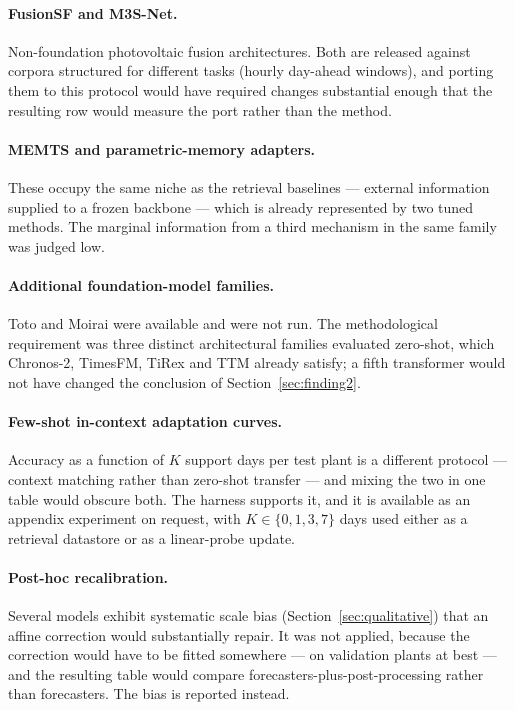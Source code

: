 \paragraph{FusionSF and M3S-Net.} Non-foundation photovoltaic fusion architectures. Both are
released against corpora structured for different tasks (hourly day-ahead windows), and
porting them to this protocol would have required changes substantial enough that the
resulting row would measure the port rather than the method.

\paragraph{MEMTS and parametric-memory adapters.} These occupy the same niche as the
retrieval baselines --- external information supplied to a frozen backbone --- which is
already represented by two tuned methods. The marginal information from a third mechanism in
the same family was judged low.

\paragraph{Additional foundation-model families.} Toto and Moirai were available and were not
run. The methodological requirement was three distinct architectural families evaluated
zero-shot, which Chronos-2, TimesFM, TiRex and TTM already satisfy; a fifth transformer would
not have changed the conclusion of Section~\ref{sec:finding2}.

\paragraph{Few-shot in-context adaptation curves.} Accuracy as a function of $K$ support days
per test plant is a different protocol --- context matching rather than zero-shot transfer ---
and mixing the two in one table would obscure both. The harness supports it, and it is
available as an appendix experiment on request, with $K \in \{0,1,3,7\}$ days used either as a
retrieval datastore or as a linear-probe update.

\paragraph{Post-hoc recalibration.} Several models exhibit systematic scale bias
(Section~\ref{sec:qualitative}) that an affine correction would substantially repair. It was
not applied, because the correction would have to be fitted somewhere --- on validation plants
at best --- and the resulting table would compare forecasters-plus-post-processing rather than
forecasters. The bias is reported instead.

